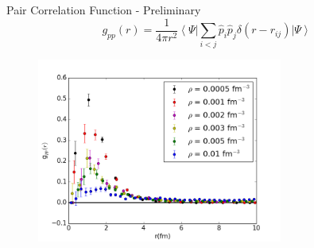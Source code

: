 \documentclass{beamer}
\newcommand{\ket}[1]{\left| #1 \right>}
\newcommand{\bra}[1]{\left< #1 \right|}
\begin{document}
\begin{frame}{Pair Correlation Function - Preliminary}
\begin{equation*}
   g_{pp}(r) = \frac{1}{4\pi r^2} \bra{\Psi}\sum\limits_{i<j}\hat{p}_i\hat{p}_j\delta(r-r_{ij})\ket{\Psi}
\end{equation*}
\vspace{-0.4cm}
\begin{figure}[h]
   \centering
   \includegraphics[width=0.72\textwidth]{gpp.png}
\end{figure}
\end{frame}
\end{document}
